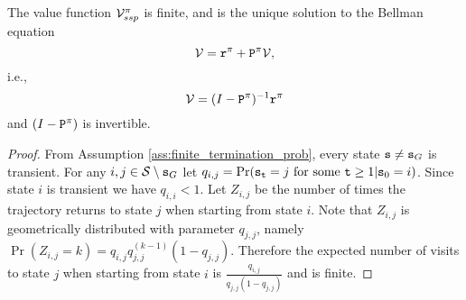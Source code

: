 \begin{proposition}\label{prop:bellman_FP_ssp}
    The value function $\mathcal{V}_{ssp}^\pi$ is finite, and is the unique solution to the Bellman equation
    \begin{equation}\label{eq:Bellman_fixed_policy_ssp}
        \mathcal{V} = {\tt r}^{\pi} + {\tt P}^\pi \mathcal{V},
    \end{equation}
    i.e.,
    \begin{equation*}
        \mathcal{V} = (I - {\tt P}^\pi)^{-1}{\tt r}^{\pi}
    \end{equation*}
    and $(I - {\tt P}^\pi)$ is invertible.
\end{proposition}

\begin{proof} 
From Assumption \ref{ass:finite_termination_prob}, every state ${\tt s} \neq {\tt s}_G$ is transient. For any $i,j \in \mathcal{S} \setminus {\tt s}_G$ let $q_{i,j}=\Pr({{\tt s}_{\tt t}} =
j { \textrm{ for some }}{\tt t} \ge 1|{{\tt s}_0} = i) $. Since state $i$ is
transient we have $q_{i,i}<1$. Let $Z_{i,j}$ be the number of times the
trajectory returns to state $j$ when starting from state $i$. Note that $Z_{i,j}$ is geometrically
distributed with parameter $q_{j,j}$, namely $\Pr(Z_{i,j}=k) = q_{i,j}q_{j,j}^{(k-1)}(1 - q_{j,j}) $.
Therefore the expected number of visits to state $j$ when starting from state $i$ is $\frac{q_{i,j}}{q_{j,j}(1-q_{j,j})}$
and is finite.


\end{proof}
